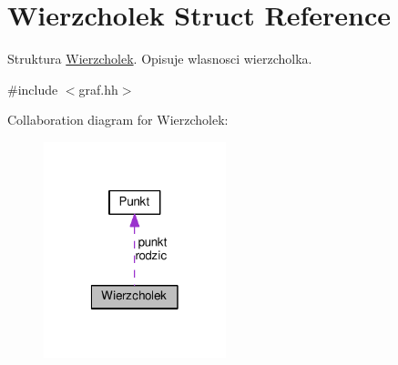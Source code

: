 \hypertarget{struct_wierzcholek}{\section{Wierzcholek Struct Reference}
\label{struct_wierzcholek}
}


Struktura \hyperlink{struct_wierzcholek}{Wierzcholek}. Opisuje wlasnosci wierzcholka.  




{\ttfamily \#include $<$graf.\-hh$>$}



Collaboration diagram for Wierzcholek\-:\nopagebreak
\begin{figure}[H]
\begin{center}
\leavevmode
\includegraphics[width=150pt]{struct_wierzcholek__coll__graph}
\end{center}
\end{figure}
